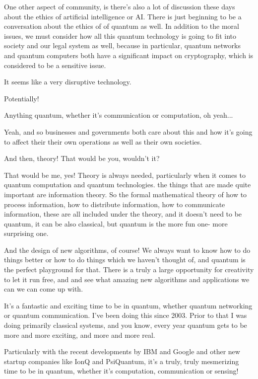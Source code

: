 One other aspect of community, is there's also a lot of discussion these days about the ethics of artificial intelligence or AI. There is just beginning to be a conversation about the ethics of of quantum as well. In addition to the moral issues, we must consider how all this quantum technology is going to fit into society and our legal system as well, because in particular, quantum networks and quantum computers both have a significant impact on cryptography, which is considered to be a sensitive issue.

\mmm It seems like a very disruptive technology. 

\rrr Potentially!

\mmm Anything quantum, whether it's communication or computation, oh yeah...

\rrr Yeah, and so businesses and governments both care about this and how it's going to affect their their own operations as well as their own societies.

And then, theory! That would be you, wouldn't it?

\mmm That would be me, yes! Theory is always needed, particularly when it comes to quantum computation and quantum technologies. the things that are made quite important are information theory. So the formal mathematical theory of how to process information, how to distribute information, how to communicate information, these are all included under the theory, and it doesn't need to be quantum, it can be also classical, but quantum is the more fun one- more surprising one.

And the design of new algorithms, of course! We always want to know how to do things better or how to do things which we haven't thought of, and quantum is the perfect playground for that. There is a truly a large opportunity for creativity to let it run free, and and see what amazing new algorithms and applications we can we can come up with.

\rrr It's a fantastic and exciting time to be in quantum, whether quantum networking or quantum communication. I've been doing this since 2003. Prior to that I was doing primarily classical systems, and you know, every year quantum gets to be more and more exciting, and more and more real.

\mmm Particularly with the recent developments by IBM and Google and other new startup companies like IonQ and PsiQuantum, it's a truly, truly mesmerizing time to be in quantum, whether it's computation, communication or sensing!

